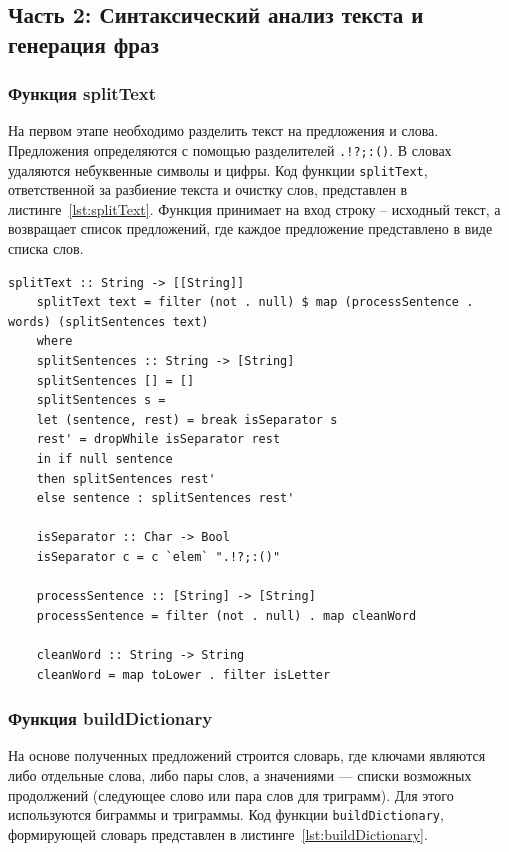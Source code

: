 \documentclass[a4paper, final]{article}
\begin{document}
\subsection{Часть 2: Синтаксический анализ текста и генерация фраз}

\subsubsection{Функция splitText}

На первом этапе необходимо разделить текст на предложения и слова. Предложения определяются с помощью разделителей \texttt{.!?;:()}. В словах удаляются небуквенные символы и цифры. Код функции \texttt{splitText}, ответственной за разбиение текста и очистку слов, представлен в листинге~\ref{lst:splitText}. Функция принимает на вход строку -- исходный текст, а возвращает список предложений, где каждое предложение представлено в виде списка слов. 

\begin{lstlisting}[caption={Функция splitText для разбора текста на предложения и слова}, label={lst:splitText}]
	splitText :: String -> [[String]]
	splitText text = filter (not . null) $ map (processSentence . words) (splitSentences text)
	where
	splitSentences :: String -> [String]
	splitSentences [] = []
	splitSentences s =
	let (sentence, rest) = break isSeparator s
	rest' = dropWhile isSeparator rest
	in if null sentence
	then splitSentences rest'
	else sentence : splitSentences rest'
	
	isSeparator :: Char -> Bool
	isSeparator c = c `elem` ".!?;:()"
	
	processSentence :: [String] -> [String]
	processSentence = filter (not . null) . map cleanWord
	
	cleanWord :: String -> String
	cleanWord = map toLower . filter isLetter
\end{lstlisting}

\subsubsection{Функция buildDictionary}

На основе полученных предложений строится словарь, где ключами являются либо отдельные слова, либо пары слов, а значениями — списки возможных продолжений (следующее слово или пара слов для триграмм). Для этого используются биграммы и триграммы. Код функции \texttt{buildDictionary}, формирующей словарь представлен в листинге~\ref{lst:buildDictionary}.
\end{document}
